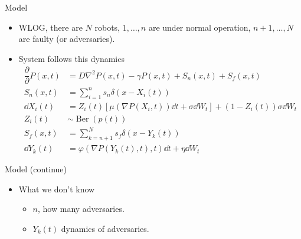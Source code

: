 \documentclass[10pt]{beamer}
\begin{document}
  \begin{frame}{Model}
    \begin{itemize}
      \item WLOG, there are $N$ robots, $1,\dots, n$ are under normal operation, $n+1, \dots, N$ are faulty (or adversaries).
      \item System follows this dynamics
        \begin{align*}
          \dfrac{\partial}{\partial} P(x,t) &= D\nabla^2 P(x,t) - \gamma P(x,t) + S_n(x,t)+ S_f(x,t)\\
          S_n(x,t) &= \sum_{i=1}^{n}s_n\delta(x-X_i(t))\\
          \dd X_i(t) &= Z_i(t)\left[\mu(\nabla P(X_i,t))\dd t + \sigma \dd W_t\right] + (1-Z_i(t))\sigma\dd W_t\\
          Z_i(t) &\sim \operatorname{Ber}(p(t))\\
          S_f(x,t) &= \sum_{k=n+1}^N s_f \delta(x-Y_k(t))\\
          \dd Y_k(t) &= \varphi(\nabla P(Y_k(t),t),t)\dd t + \eta \dd W_t
        \end{align*}
    \end{itemize}
  \end{frame}
  \begin{frame}{Model (continue)}
  \begin{itemize}
  \item What we don't know
        \begin{itemize}
          \item $n$, how many adversaries.
          \item $Y_k(t)$ dynamics of adversaries.
        \end{itemize}
  \end{itemize}
  \end{frame}
\end{document}

